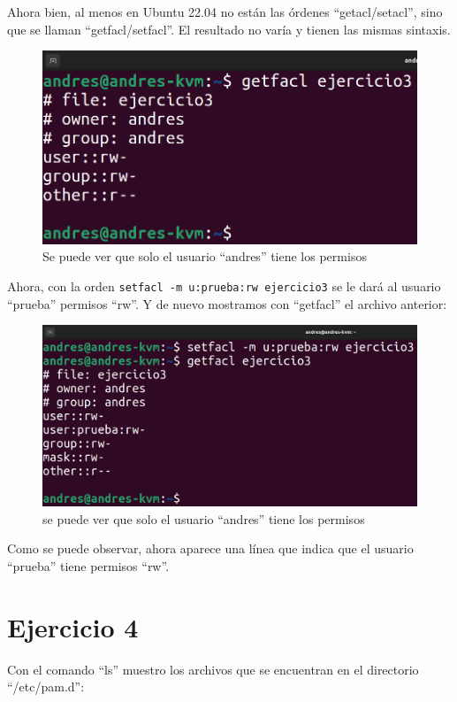 \documentclass{article}
\begin{document}
Ahora bien, al menos en Ubuntu 22.04 no están las órdenes ``getacl/setacl'', sino que se llaman ``getfacl/setfacl''. El resultado no varía y tienen las mismas sintaxis.

\begin{figure}[H]
    \includegraphics[width=\textwidth]{imagenes/getfaclorg.png}
    \caption{Se puede ver que solo el usuario ``andres'' tiene los permisos}
\end{figure}


Ahora, con la orden \verb|setfacl -m u:prueba:rw ejercicio3| se le dará al usuario ``prueba'' permisos ``rw''. Y de nuevo mostramos con ``getfacl'' el archivo anterior:

\begin{figure}[H]
    \includegraphics[width=\textwidth]{imagenes/getfaclnew.png}
    \caption{se puede ver que solo el usuario ``andres'' tiene los permisos}
\end{figure}

Como se puede observar, ahora aparece una línea que indica que el usuario ``prueba'' tiene permisos ``rw''.


\section*{Ejercicio 4}
Con el comando ``ls'' muestro los archivos que se encuentran en el directorio ``/etc/pam.d'':
\end{document}
